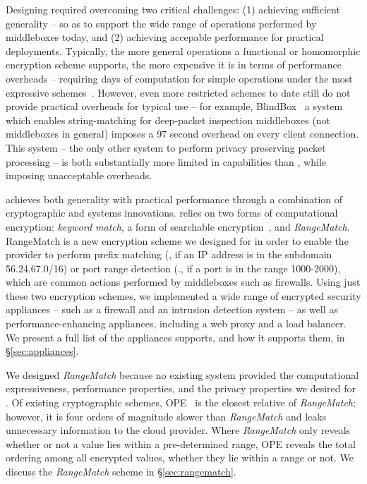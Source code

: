    Designing \sys required overcoming two critical challenges: (1) achieving sufficient generality -- so as to support the wide range of operations performed by middleboxes today, and (2) achieving accepable performance for practical deployments. 
    Typically, the more general operations a functional or homomorphic encryption scheme supports, the more expensive it is in terms of performance overheads -- requiring days of computation for simple operations under the most expressive schemes~\cite{fhe, blah, blah}.
    However, even more restricted schemes to date still do not provide practical overheads for typical use -- for example, BlindBox~\cite{blindbox} a system which enables string-matching for deep-packet inspection middleboxes (not middleboxes in general) imposes a 97 second overhead on every client connection.
    This system -- the only other system to perform privacy preserving packet processing -- is both substantially more limited in capabilities than \sys, while imposing unacceptable overheads.

    \sys achieves both generality with practical performance through a combination of cryptographic and systems innovations.
    \sys relies on two forms of computational encryption: {\it keyword match}, a form of searchable encryption~\cite{blindbox}, and {\it RangeMatch}.
    RangeMatch is a new encryption scheme we designed for \sys in order to enable the provider to perform prefix matching (\eg{}, if an IP address is in the subdomain 56.24.67.0/16) or port range detection (\eg., if a port is in the range 1000-2000), which are common actions performed by middleboxes such as firewalls. 
    Using just these two encryption schemes, we implemented a wide range of encrypted security appliances -- such as a firewall and an intrusion detection system -- as well as performance-enhancing appliances, including  a web proxy and a load balancer. 
    We present a full list of the appliances \sys supports, and how it supports them, in \S\ref{sec:appliances}.

    We designed {\it RangeMatch} because no existing system provided the computational expressiveness, performance properties, and the privacy properties we desired for \sys.
    Of existing cryptographic schemes, OPE~\cite{cryptdb} is the closest relative of {\it RangeMatch}; however, it is four orders of magnitude slower than {\it RangeMatch} and leaks unnecessary information to the cloud provider.
    Where {\em RangeMatch} only reveals whether or not a value lies within a pre-determined range, OPE reveals the total ordering among all encrypted values, whether they lie within a range or not.
    We discuss the {\em RangeMatch} scheme in \S\ref{sec:rangematch}.

